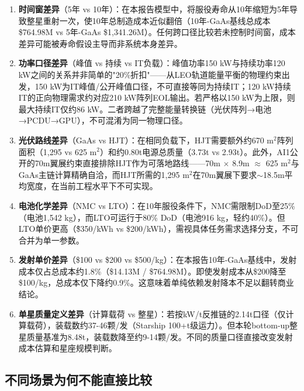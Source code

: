 \begin{enumerate}
  \item \textbf{时间窗差异}（5年 vs 10年）：在本报告模型中，将服役寿命从10年缩短为5年导致整星重射一次，使10年总制造成本近似翻倍（10年-GaAs基线总成本\$764.98M vs 5年-GaAs \$1,341.26M）。任何跨口径比较若未控制时间窗，成本差异可能被寿命假设主导而非系统本身差异。
  
  \item \textbf{功率口径差异}（峰值 vs 持续 vs IT负载）：峰值功率150 kW与持续功率120 kW之间的关系并非简单的"20\%折扣"——从LEO轨道能量平衡的物理约束出发，150 kW为IT峰值/公开峰值口径，不可直接等同为持续IT；120 kW持续IT的正向物理需求约对应210 kW阵列EOL输出。若严格以150 kW为上限，则最大持续IT仅约86 kW。二者跨越了完整能量转换链（光伏阵列→电池→PCDU→GPU），不可混淆为同一物理口径。

  \item \textbf{光伏路线差异}（GaAs vs HJT）：在相同负载下，HJT需要额外约670 m$^2$阵列面积（1,295 vs 625 m$^2$）和约0.80t电源总质量（3.73t vs 2.93t）。此外，AI1公开的70m翼展约束直接排除HJT作为可落地路线——70m $\times$ 8.9m $\approx$ 625 m$^2$与GaAs主链计算精确自洽，而HJT所需的1,295 m$^2$在70m翼展下要求$\sim$18.5m平均宽度，在当前工程水平下不可实现。

  \item \textbf{电池化学差异}（NMC vs LTO）：在10年服役条件下，NMC需限制DoD至25\%（电池1,542 kg），而LTO可运行于80\% DoD（电池916 kg，轻约40\%）。但LTO单价更高（\~\$350/kWh vs \$200/kWh），需视具体任务需求选择分支，不可合并为单一参数。

  \item \textbf{发射单价差异}（\$100 vs \$200 vs \$500/kg）：在本报告10年-GaAs基线中，发射成本仅占总成本约1.8\%（\$14.13M / \$764.98M）。即使发射成本从\$200降至\$100/kg，总成本仅下降约0.9\%。这意味着单纯依赖发射降本不足以翻转商业结论。

  \item \textbf{单星质量定义差异}（计算载荷 vs 整星）：若按kW/t反推链的2.14t口径（仅计算载荷），装载数约37-46颗/发（Starship 100+t级运力）。但本轮bottom-up整星质量基准为8.48t，装载数降至约9-14颗/发。不同的质量口径直接改变发射成本估算和星座规模判断。
\end{enumerate}

\subsection{不同场景为何不能直接比较}

